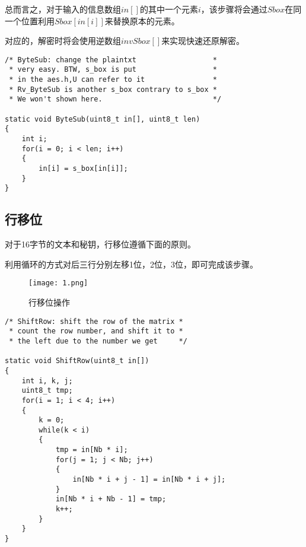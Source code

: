 \documentclass[UTF8]{ctexart}
\begin{document}
总而言之，对于输入的信息数组$in[]$的其中一个元素$i$，该步骤将会通过$Sbox$在同一个位置利用$Sbox[in[i]]$来替换原本的元素。

对应的，解密时将会使用逆数组$invSbox[]$来实现快速还原解密。
\begin{lstlisting}
/* ByteSub: change the plaintxt                  *
 * very easy. BTW, s_box is put                  *
 * in the aes.h,U can refer to it                *
 * Rv_ByteSub is another s_box contrary to s_box *
 * We won't shown here.                          */

static void ByteSub(uint8_t in[], uint8_t len)
{
	int i;
	for(i = 0; i < len; i++)
	{
		in[i] = s_box[in[i]];
	}
}
\end{lstlisting}
\subsection{行移位}
对于16字节的文本和秘钥，行移位遵循下面的原则。

利用循环的方式对后三行分别左移1位，2位，3位，即可完成该步骤。

\begin{figure}[h]
  \centering
  \texttt{[image: 1.png]} 
  \caption{行移位操作} 
  \label{img} 
\end{figure}

\begin{lstlisting}
/* ShiftRow: shift the row of the matrix *
 * count the row number, and shift it to *
 * the left due to the number we get     */

static void ShiftRow(uint8_t in[])
{
	int i, k, j;
	uint8_t tmp;
	for(i = 1; i < 4; i++)
	{
		k = 0;
		while(k < i)
		{
			tmp = in[Nb * i];
			for(j = 1; j < Nb; j++)
			{
				in[Nb * i + j - 1] = in[Nb * i + j];
			}
			in[Nb * i + Nb - 1] = tmp;
			k++;
		}
	}
}
\end{lstlisting}
\end{document}
